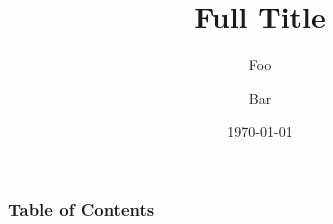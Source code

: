 \documentclass[zh]{fatslides} %
\title[Short Title]{Full Title}
\author[Short Author]{Foo \and Bar}
\date[\today]{\today}
\begin{document}
\frame{\titlepage}

\begin{frame}
    \frametitle{Table of Contents}
    \tableofcontents
\end{frame}






\end{document}
